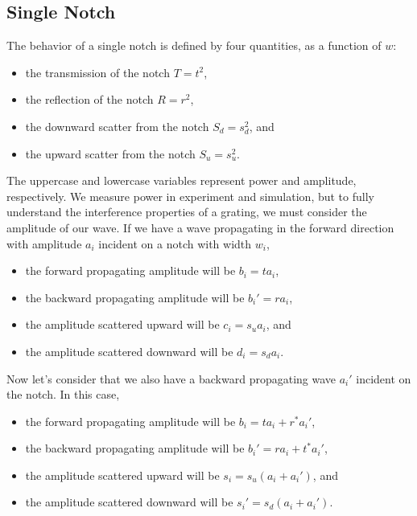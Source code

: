 \documentclass[10pt, letter, oneside,graphicx]{article}
\begin{document}
\subsection{Single Notch}
The behavior of a single notch is defined by four quantities, as a function of $w$:
\begin{itemize}
    \item the transmission of the notch $T = t^2$,
    \item the reflection of the notch $R = r^2$,
    \item the downward scatter from the notch $S_d = s_d^2$, and
    \item the upward scatter from the notch $S_u = s_u^2$.
\end{itemize}
The uppercase and lowercase variables represent power and amplitude, respectively. We measure power in experiment and simulation, but to fully understand the interference properties of a grating, we must consider the amplitude of our wave. If we have a wave propagating in the forward direction with amplitude $a_i$ incident on a notch with width $w_i$,
\begin{itemize}
    \item the forward propagating amplitude will be $b_i = ta_i$,
    \item the backward propagating amplitude will be $b_i' = ra_i$,
    \item the amplitude scattered upward will be $c_i = s_ua_i$, and
    \item the amplitude scattered downward will be $d_i = s_da_i$.
\end{itemize}
Now let's consider that we also have a backward propagating wave $a_i'$ incident on the notch.
In this case,
\begin{itemize}
    \item the forward propagating amplitude will be $b_i = ta_i + r^*a_i'$,
    \item the backward propagating amplitude will be $b_i' = ra_i + t^*a_i'$,
    \item the amplitude scattered upward will be $s_i = s_u(a_i + a_i')$, and
    \item the amplitude scattered downward will be $s_i' = s_d(a_i + a_i')$.
\end{itemize}
\newcommand{\x}{2.5}
\newcommand{\y}{1.2}
\newcommand{\yp}{.8}
\newcommand{\aw}{.75}
\newcommand{\yt}{1.6}
\newcommand{\xt}{.4}
\newcommand{\xtt}{.25}
\end{document}
